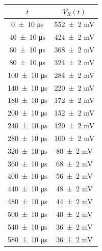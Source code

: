 \documentclass[a4paper]{article}
\begin{document}
\begin{appendices}
\begin{table}[htbp]
    \centering
    \begin{minipage}{0.48\textwidth} %
        \centering\small
        \begin{tabular}{|c|c|}
        \hline
         \( t \) & \( V_R(t) \) \\ %
        \hline\hline
        \num{0    \pm 10} \si{\micro\second} & \num{552  \pm 2} \si{\milli\volt} \\
        \num{40   \pm 10} \si{\micro\second} & \num{424  \pm 2} \si{\milli\volt} \\
        \num{60   \pm 10} \si{\micro\second} & \num{368  \pm 2} \si{\milli\volt} \\
        \num{80   \pm 10} \si{\micro\second} & \num{324  \pm 2} \si{\milli\volt} \\
        \num{100  \pm 10} \si{\micro\second} & \num{284  \pm 2} \si{\milli\volt} \\
        \num{140  \pm 10} \si{\micro\second} & \num{220  \pm 2} \si{\milli\volt} \\
        \num{180  \pm 10} \si{\micro\second} & \num{172  \pm 2} \si{\milli\volt} \\
        \num{200  \pm 10} \si{\micro\second} & \num{152  \pm 2} \si{\milli\volt} \\
        \num{240  \pm 10} \si{\micro\second} & \num{120  \pm 2} \si{\milli\volt} \\
        \num{280  \pm 10} \si{\micro\second} & \num{100  \pm 2} \si{\milli\volt} \\
        \num{320  \pm 10} \si{\micro\second} & \num{80   \pm 2} \si{\milli\volt} \\
        \num{360  \pm 10} \si{\micro\second} & \num{68   \pm 2} \si{\milli\volt} \\
        \num{400  \pm 10} \si{\micro\second} & \num{56   \pm 2} \si{\milli\volt} \\
        \num{440  \pm 10} \si{\micro\second} & \num{48   \pm 2} \si{\milli\volt} \\
        \num{480  \pm 10} \si{\micro\second} & \num{44   \pm 2} \si{\milli\volt} \\
        \num{500  \pm 10} \si{\micro\second} & \num{40   \pm 2} \si{\milli\volt} \\
        \num{540  \pm 10} \si{\micro\second} & \num{36   \pm 2} \si{\milli\volt} \\
        \num{580  \pm 10} \si{\micro\second} & \num{36   \pm 2} \si{\milli\volt} \\

\end{tabular}
\end{minipage}
\end{table}
\end{appendices}
\end{document}
